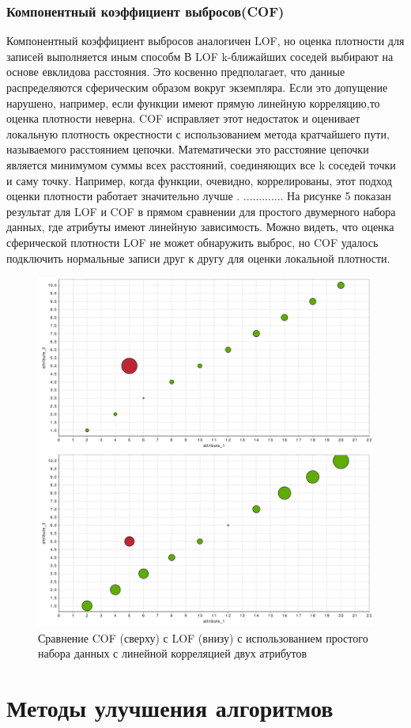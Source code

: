 \subsubsection{Компонентный коэффициент выбросов(COF)}
Компонентный коэффициент выбросов аналогичен LOF, но оценка плотности для записей выполняется иным способм В LOF k-ближайших соседей выбирают на основе евклидова расстояния. Это косвенно предполагает, что данные распределяются сферическим образом вокруг экземпляра. Если это допущение нарушено, например, если функции имеют прямую линейную корреляцию,то оценка плотности неверна. COF исправляет этот недостаток и оценивает локальную плотность окрестности с использованием метода кратчайшего пути, называемого расстоянием цепочки. Математически это расстояние цепочки является минимумом суммы всех расстояний, соединяющих все k соседей точки и саму точку. Например, когда функции, очевидно, коррелированы, этот подход оценки плотности работает значительно лучше \cite{Book14}. 
.............
На рисунке 5 показан результат для LOF и COF в прямом сравнении для простого двумерного набора данных, где атрибуты имеют линейную зависимость. Можно видеть, что оценка сферической плотности LOF не может обнаружить выброс, но COF удалось подключить нормальные записи друг к другу для оценки локальной плотности.
\begin{figure}
	\centering
	\includegraphics[width=.5\textwidth]{img/5_3rdpart.png}
	\caption{Сравнение COF (сверху) с LOF (внизу) с использованием простого набора данных с линейной корреляцией двух атрибутов}
	\label{fig05}
\end{figure}
\section{Методы улучшения алгоритмов}
